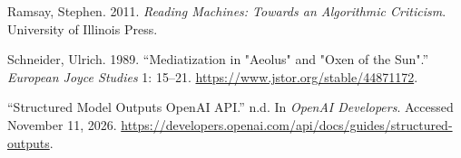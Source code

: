 \documentclass[
  letterpaper,
  DIV=11,
  numbers=noendperiod]{scrartcl}
\newlength{\cslhangindent}
\newenvironment{CSLReferences}[2] %
 {\begin{list}{}{%
  \setlength{\itemindent}{0pt}
  \setlength{\leftmargin}{0pt}
  \setlength{\parsep}{0pt}
  \ifodd #1
   \setlength{\leftmargin}{\cslhangindent}
   \setlength{\itemindent}{-1\cslhangindent}
  \fi
  \setlength{\itemsep}{#2\baselineskip}}}
 {\end{list}}
\begin{document}
\begin{CSLReferences}{1}{1}
Ramsay, Stephen. 2011. \emph{Reading {Machines}: {Towards} an
{Algorithmic} {Criticism}}. University of Illinois Press.

Schneider, Ulrich. 1989. {``Mediatization in "{Aeolus}" and "{Oxen} of
the {Sun}".''} \emph{European Joyce Studies} 1: 15--21.
\url{https://www.jstor.org/stable/44871172}.

{``Structured Model Outputs {\textbar} {OpenAI} {API}.''} n.d. In
\emph{OpenAI Developers}. Accessed November 11, 2026.
\url{https://developers.openai.com/api/docs/guides/structured-outputs}.

\end{CSLReferences}
\end{document}
